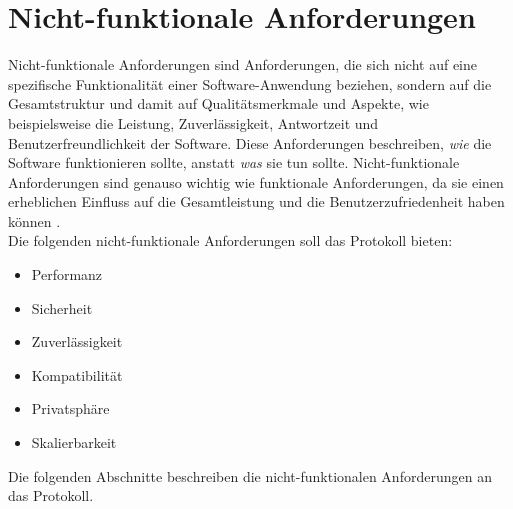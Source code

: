 \section{Nicht-funktionale Anforderungen}


Nicht-funktionale Anforderungen sind Anforderungen, die sich nicht auf eine 
spezifische Funktionalität einer Software-Anwendung beziehen, sondern auf die Gesamtstruktur und damit auf
Qualitätsmerkmale und Aspekte, wie beispielsweise die Leistung, Zuverlässigkeit, Antwortzeit und Benutzerfreundlichkeit 
der Software. 
Diese Anforderungen beschreiben, \textit{wie} die Software funktionieren sollte, anstatt \textit{was} sie tun sollte. 
Nicht-funktionale Anforderungen sind genauso wichtig wie funktionale Anforderungen, da sie einen 
erheblichen Einfluss auf die Gesamtleistung und die Benutzerzufriedenheit haben können
\parencite[S. 126-130]{AnfAnalyse_Sommerville}.
\\
Die folgenden nicht-funktionale Anforderungen soll das Protokoll bieten:

\begin{itemize}
    \item Performanz
    \item Sicherheit
    \item Zuverlässigkeit
    \item Kompatibilität
    \item Privatsphäre
    \item Skalierbarkeit
\end{itemize}

\noindent Die folgenden Abschnitte beschreiben die nicht-funktionalen Anforderungen an das Protokoll.